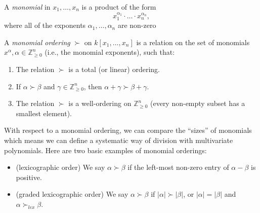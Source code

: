 \documentclass[../main.tex]{subfiles}
\begin{document}
    \begin{definition}
        A \emph{monomial} in $x_1,\dots,x_n$ is a product of the form
        $$x_1^{\alpha_1}\cdot\dots\cdot x_n^{\alpha_n},$$
        where all of the exponents $\alpha_1,\dots,\alpha_n$ are non-zero
    \end{definition}


    \begin{definition}
        A \emph{monomial ordering} $\succ$ on $k[x_1,\dots,x_n]$ is a relation on the set of monomials $x^\alpha, \alpha\in\mathbb{Z}^n_{\geq 0}$ (i.e., the monomial exponents), such that:
        \begin{enumerate}
            \item The relation $\succ$ is a total (or linear) ordering.
            \item If $\alpha \succ \beta$ and $\gamma\in \mathbb{Z}^n_{\geq0}$, then $\alpha+\gamma\succ\beta+\gamma$.
            \item The relation $\succ$ is a well-ordering on $\mathbb{Z}^n_{\geq0}$ (every non-empty subset has a smallest element).
        \end{enumerate}
    \end{definition}
    With respect to a monomial ordering, we can compare the ``sizes'' of monomials which means we can define a systematic way of division with multivariate polynomials. Here are two basic examples of monomial orderings:
    \begin{itemize}
        \item (lexicographic order) We say $\alpha\succ\beta$ if the left-most non-zero entry of $\alpha-\beta$ is positive.
        \item (graded lexicographic order) We say $\alpha\succ\beta$ if $|\alpha|\succ|\beta|$, or $|\alpha|=|\beta|$ and $\alpha\succ_{lex}\beta$.
    \end{itemize}
    

\end{document}
